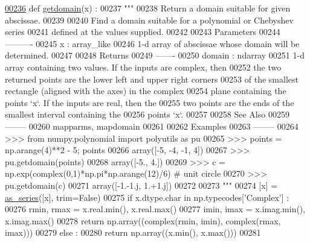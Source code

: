 \begin{DoxyCode}
\hypertarget{namespacepyneb_1_1utils_1_1polyutils_l00236}{}\hyperlink{namespacepyneb_1_1utils_1_1polyutils_a3216f3b76273619e84e2e0e6c22dbf21}{00236} \textcolor{keyword}{def }\hyperlink{namespacepyneb_1_1utils_1_1polyutils_a3216f3b76273619e84e2e0e6c22dbf21}{getdomain}(x) :
00237     \textcolor{stringliteral}{"""}
00238 \textcolor{stringliteral}{    Return a domain suitable for given abscissae.}
00239 \textcolor{stringliteral}{}
00240 \textcolor{stringliteral}{    Find a domain suitable for a polynomial or Chebyshev series}
00241 \textcolor{stringliteral}{    defined at the values supplied.}
00242 \textcolor{stringliteral}{}
00243 \textcolor{stringliteral}{    Parameters}
00244 \textcolor{stringliteral}{    ----------}
00245 \textcolor{stringliteral}{    x : array\_like}
00246 \textcolor{stringliteral}{        1-d array of abscissae whose domain will be determined.}
00247 \textcolor{stringliteral}{}
00248 \textcolor{stringliteral}{    Returns}
00249 \textcolor{stringliteral}{    -------}
00250 \textcolor{stringliteral}{    domain : ndarray}
00251 \textcolor{stringliteral}{        1-d array containing two values.  If the inputs are complex, then}
00252 \textcolor{stringliteral}{        the two returned points are the lower left and upper right corners}
00253 \textcolor{stringliteral}{        of the smallest rectangle (aligned with the axes) in the complex}
00254 \textcolor{stringliteral}{        plane containing the points `x`. If the inputs are real, then the}
00255 \textcolor{stringliteral}{        two points are the ends of the smallest interval containing the}
00256 \textcolor{stringliteral}{        points `x`.}
00257 \textcolor{stringliteral}{}
00258 \textcolor{stringliteral}{    See Also}
00259 \textcolor{stringliteral}{    --------}
00260 \textcolor{stringliteral}{    mapparms, mapdomain}
00261 \textcolor{stringliteral}{}
00262 \textcolor{stringliteral}{    Examples}
00263 \textcolor{stringliteral}{    --------}
00264 \textcolor{stringliteral}{    >>> from numpy.polynomial import polyutils as pu}
00265 \textcolor{stringliteral}{    >>> points = np.arange(4)**2 - 5; points}
00266 \textcolor{stringliteral}{    array([-5, -4, -1,  4])}
00267 \textcolor{stringliteral}{    >>> pu.getdomain(points)}
00268 \textcolor{stringliteral}{    array([-5.,  4.])}
00269 \textcolor{stringliteral}{    >>> c = np.exp(complex(0,1)*np.pi*np.arange(12)/6) # unit circle}
00270 \textcolor{stringliteral}{    >>> pu.getdomain(c)}
00271 \textcolor{stringliteral}{    array([-1.-1.j,  1.+1.j])}
00272 \textcolor{stringliteral}{}
00273 \textcolor{stringliteral}{    """}
00274     [x] = \hyperlink{namespacepyneb_1_1utils_1_1polyutils_a9c3751d438f0f75922155c7823fe2699}{as\_series}([x], trim=\textcolor{keyword}{False})
00275     \textcolor{keywordflow}{if} x.dtype.char \textcolor{keywordflow}{in} np.typecodes[\textcolor{stringliteral}{'Complex'}] :
00276         rmin, rmax = x.real.min(), x.real.max()
00277         imin, imax = x.imag.min(), x.imag.max()
00278         \textcolor{keywordflow}{return} np.array((complex(rmin, imin), complex(rmax, imax)))
00279     \textcolor{keywordflow}{else} :
00280         \textcolor{keywordflow}{return} np.array((x.min(), x.max()))
00281 
\end{DoxyCode}
